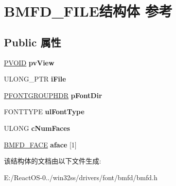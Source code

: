 \hypertarget{struct_b_m_f_d___f_i_l_e}{}\section{B\+M\+F\+D\+\_\+\+F\+I\+L\+E结构体 参考}
\label{struct_b_m_f_d___f_i_l_e}
\subsection*{Public 属性}
\begin{DoxyCompactItemize}
\item 
\mbox{\label{struct_b_m_f_d___f_i_l_e_a28821834005700414361f19d8b87e111}} 
\hyperlink{interfacevoid}{P\+V\+O\+ID} {\bfseries pv\+View}
\item 
\mbox{\label{struct_b_m_f_d___f_i_l_e_a6b11fdb46804c12762ee9963c22edd59}} 
U\+L\+O\+N\+G\+\_\+\+P\+TR {\bfseries i\+File}
\item 
\mbox{\label{struct_b_m_f_d___f_i_l_e_a08fd478d43e2cf4b811a7d9bccf86383}} 
\hyperlink{struct___f_o_n_t_g_r_o_u_p_h_d_r}{P\+F\+O\+N\+T\+G\+R\+O\+U\+P\+H\+DR} {\bfseries p\+Font\+Dir}
\item 
\mbox{\label{struct_b_m_f_d___f_i_l_e_ab22a0f7aff42180289f0b6ee43ab03d5}} 
F\+O\+N\+T\+T\+Y\+PE {\bfseries ul\+Font\+Type}
\item 
\mbox{\label{struct_b_m_f_d___f_i_l_e_a56e694cbadcd803645155452bc88dd3f}} 
U\+L\+O\+NG {\bfseries c\+Num\+Faces}
\item 
\mbox{\label{struct_b_m_f_d___f_i_l_e_afd2539ea515b754488800c9d02dc0fae}} 
\hyperlink{struct_b_m_f_d___f_a_c_e}{B\+M\+F\+D\+\_\+\+F\+A\+CE} {\bfseries aface} \mbox{[}1\mbox{]}
\end{DoxyCompactItemize}


该结构体的文档由以下文件生成\+:\begin{DoxyCompactItemize}
\item 
E\+:/\+React\+O\+S-\/0../win32ss/drivers/font/bmfd/bmfd.\+h\end{DoxyCompactItemize}
